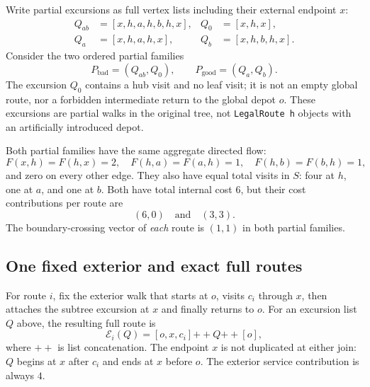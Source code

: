 \documentclass[11pt]{article}
\theoremstyle{remark}
\newcommand{\code}[1]{\nolinkurl{#1}}
\begin{document}
Write partial excursions as full vertex lists including their external endpoint $x$:
\begin{align*}
 Q_{ab}&=[x,h,a,h,b,h,x],& Q_0&=[x,h,x],\\
 Q_a&=[x,h,a,h,x],& Q_b&=[x,h,b,h,x].
\end{align*}
Consider the two ordered partial families
\[
 P_{\mathrm{bad}}=(Q_{ab},Q_0),\qquad
 P_{\mathrm{good}}=(Q_a,Q_b).
\]
The excursion $Q_0$ contains a hub visit and no leaf visit; it is not an empty global route, nor a forbidden intermediate return to the global depot $o$.
These excursions are partial walks in the original tree, not \code{LegalRoute h} objects with an artificially introduced depot.

Both partial families have the same aggregate directed flow:
\begin{equation}\label{eq:inside-flow}
 F(x,h)=F(h,x)=2,\quad F(h,a)=F(a,h)=1,\quad
 F(h,b)=F(b,h)=1,
\end{equation}
and zero on every other edge. They also have equal total visits in $S$: four at $h$, one at $a$, and one at $b$.
Both have total internal cost $6$, but their cost contributions per route are
\begin{equation}\label{eq:inside-cost}
 (6,0)\quad\text{and}\quad(3,3).
\end{equation}
The boundary-crossing vector of \emph{each} route is $(1,1)$ in both partial families.

\subsection{One fixed exterior and exact full routes}

For route $i$, fix the exterior walk that starts at $o$, visits $c_i$ through $x$, then attaches the subtree excursion at $x$ and finally returns to $o$.
For an excursion list $Q$ above, the resulting full route is
\[
 \mathcal E_i(Q)=[o,x,c_i]\mathbin{+\!+}Q\mathbin{+\!+}[o],
\]
where $+\!+$ is list concatenation. The endpoint $x$ is not duplicated at either join: $Q$ begins at $x$ after $c_i$ and ends at $x$ before $o$.
The exterior service contribution is always $4$.
\end{document}
